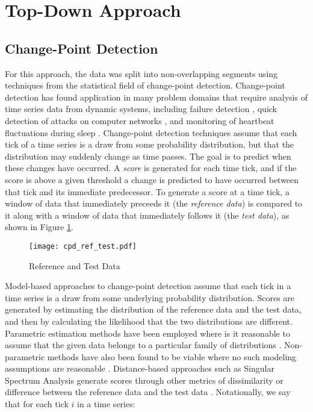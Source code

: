 
\section{Top-Down Approach}
\label{sec:topdown}

\subsection{Change-Point Detection}
For this approach, the data was split into non-overlapping segments
using techniques from the statistical field of change-point
detection. Change-point detection has found application in many problem domains
that require analysis of time series data from dynamic systems, including
failure detection \cite{bae13}, quick detection of attacks on computer networks
\cite{tartakovsky06}, and monitoring of heartbeat fluctuations during
sleep \cite{staudacher05}. Change-point detection techniques assume that each
tick of a time series is a draw from some probability
distribution, but that the distribution may suddenly change as time passes.
The goal is to predict when these changes have occurred.
A \emph{score} is generated for each time tick, and if the score is
above a given threshold a change is predicted to have occurred between that tick
and its immediate predecessor. To generate a score at a time tick, a window of
data that immediately preceeds it (the \emph{reference data}) is compared to it
along with a window of data that immediately follows it (the \emph{test data}), 
as shown in Figure \ref{fig:cpd_ref_test}.

\begin{figure}
 \centering
 \texttt{[image: cpd\_ref\_test.pdf]}
 \caption{Reference and Test Data}
 \label{fig:cpd_ref_test}
\end{figure}

Model-based approaches to change-point detection assume that each tick in
a time series is a draw from some underlying probability distribution.
Scores are generated by estimating the distribution of the reference data
and the test data, and then by calculating the likelihood
that the two distributions are different. Parametric estimation methods have
been employed where is it reasonable to assume that the given data belongs to a
particular family of distributions \cite{thatte11}. Non-parametric methods have
also been found to be viable where no such modeling
assumptions are reasonable \cite{matteson12}. Distance-based approaches such as
Singular Spectrum Analysis generate scores through other metrics of 
dissimilarity or difference between the reference data and the test data
\cite{moskvina03}.
Notationally, we say that for each tick $i$ in a time series:

